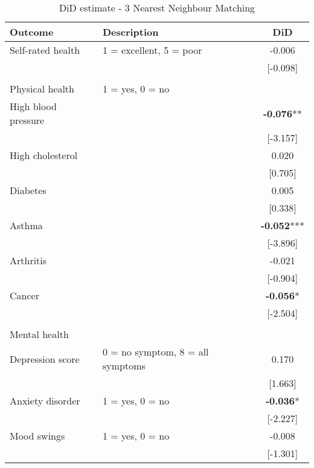 \begin{table}[h!]
    \centering
        \caption{DiD estimate - 3 Nearest Neighbour Matching}
        \label{app:did_matching_3nn}
        \begin{tabular}{llc}
            \toprule
            Outcome & Description & DiD \\
            \midrule
            Self-rated health & 1 = excellent, 5 = poor & -0.006 \\
            &  & [-0.098] \\
            & & \\
            Physical health & 1 = yes, 0 = no & \\
            High blood pressure &  & \textbf{-0.076}** \\
            &  & [-3.157] \\
            High cholesterol &  & 0.020 \\
            &  & [0.705] \\
            Diabetes &  & 0.005 \\
            &  & [0.338] \\
            Asthma &  & \textbf{-0.052}*** \\
            &  & [-3.896] \\
            Arthritis &  & -0.021 \\
            &  & [-0.904] \\
            Cancer &  & \textbf{-0.056}* \\
            &  & [-2.504] \\
            & & \\
            Mental health & & \\
            Depression score & 0 = no symptom, 8 = all symptoms & 0.170 \\
            &  & [1.663] \\
            Anxiety disorder & 1 = yes, 0 = no & \textbf{-0.036}* \\
            &  & [-2.227] \\
            Mood swings & 1 = yes, 0 = no & -0.008 \\
            &  & [-1.301] \\
            \bottomrule
        \end{tabular}
\end{table}

